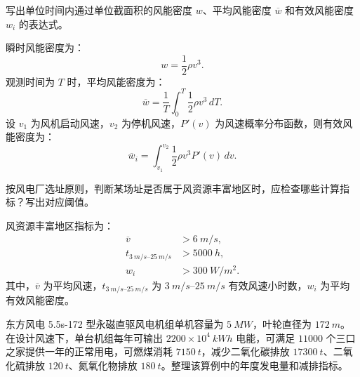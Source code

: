 \begin{problem}[风能密度]\label{exer:calc_03_wind_p028_01}
写出单位时间内通过单位截面积的风能密度 \(w\)、平均风能密度 \(\overline{w}\) 和有效风能密度 \(w_i\) 的表达式。
\end{problem}

\begin{solution}
瞬时风能密度为：
\begin{equation}
w = \frac{1}{2}\rho v^3.
\end{equation}
观测时间为 \(T\) 时，平均风能密度为：
\begin{equation}
\overline{w}
= \frac{1}{T}\int_0^T \frac{1}{2}\rho v^3\,dT.
\end{equation}
设 \(v_1\) 为风机启动风速，\(v_2\) 为停机风速，\(P'(v)\) 为风速概率分布函数，则有效风能密度为：
\begin{equation}
\overline{w}_i
= \int_{v_1}^{v_2}\frac{1}{2}\rho v^3 P'(v)\,dv.
\end{equation}
\end{solution}

\begin{problem}[风资源丰富区指标判断]\label{exer:calc_03_wind_p037_01}
按风电厂选址原则，判断某场址是否属于风资源丰富地区时，应检查哪些计算指标？写出对应阈值。
\end{problem}

\begin{solution}
风资源丰富地区指标为：
\begin{equation*}
\begin{aligned}
\overline{v} &> \qty{6}{m/s},\\
t_{\qtyrange{3}{25}{m/s}} &> \qty{5000}{h},\\
w_i &> \qty{300}{W/m^2}.
\end{aligned}
\end{equation*}
其中，\(\overline{v}\) 为平均风速，\(t_{\qtyrange{3}{25}{m/s}}\) 为 \(\qtyrange{3}{25}{m/s}\) 有效风速小时数，\(w_i\) 为平均有效风能密度。
\end{solution}

\begin{problem}[5.5s-172 机组年发电量与减排量]\label{exer:calc_03_wind_p040_01}
东方风电 5.5s-172 型永磁直驱风电机组单机容量为 \(\qty{5}{MW}\)，叶轮直径为 \(\qty{172}{m}\)。在设计风速下，单台机组每年可输出 \(2200 \times 10^4\ \unit{kWh}\) 电能，可满足 \(\num{11000}\) 个三口之家提供一年的正常用电，可燃煤消耗 \(\qty{7150}{t}\)，减少二氧化碳排放 \(\qty{17300}{t}\)、二氧化硫排放 \(\qty{120}{t}\)、氮氧化物排放 \(\qty{180}{t}\)。整理该算例中的年度发电量和减排指标。
\end{problem}

